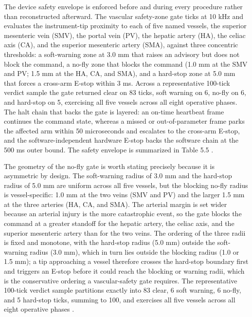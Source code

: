 The device safety envelope is enforced before and during every procedure rather
than reconstructed afterward. The vascular safety-zone gate ticks at 10 kHz and
evaluates the instrument-tip proximity to each of five named vessels, the superior
mesenteric vein (SMV), the portal vein (PV), the hepatic artery (HA), the celiac
axis (CA), and the superior mesenteric artery (SMA), against three concentric
thresholds: a soft-warning zone at 3.0 mm that raises an advisory but does not block
the command, a no-fly zone that blocks the command (1.0 mm at the SMV and PV; 1.5 mm
at the HA, CA, and SMA), and a hard-stop zone at 5.0 mm that forces a cross-arm
E-stop within 3 ms. Across a representative 100-tick verdict sample the gate
returned clear on 83 ticks, soft warning on 6, no-fly on 6, and hard-stop on 5,
exercising all five vessels across all eight operative phases. The halt chain that
backs the gate is layered: an on-time heartbeat frame continues the command state,
whereas a missed or out-of-parameter frame parks the affected arm within 50
microseconds and escalates to the cross-arm E-stop, and the software-independent
hardware E-stop backs the software chain at the 500 ms outer bound. The safety
envelope is summarized in Table 5.5 \cite{daraxwhipple,clintrustpai}.

The geometry of the no-fly gate is worth stating precisely because it is
asymmetric by design. The soft-warning radius of 3.0 mm and the hard-stop radius of
5.0 mm are uniform across all five vessels, but the blocking no-fly radius is
vessel-specific: 1.0 mm at the two veins (SMV and PV) and the larger 1.5 mm at the
three arteries (HA, CA, and SMA). The arterial margin is set wider because an
arterial injury is the more catastrophic event, so the gate blocks the command at a
greater standoff for the hepatic artery, the celiac axis, and the superior
mesenteric artery than for the two veins. The ordering of the three radii is fixed
and monotone, with the hard-stop radius (5.0 mm) outside the soft-warning radius
(3.0 mm), which in turn lies outside the blocking radius (1.0 or 1.5 mm); a tip
approaching a vessel therefore crosses the hard-stop boundary first and triggers an
E-stop before it could reach the blocking or warning radii, which is the
conservative ordering a vascular-safety gate requires. The representative 100-tick
verdict sample partitions exactly into 83 clear, 6 soft warning, 6 no-fly, and 5
hard-stop ticks, summing to 100, and exercises all five vessels across all eight
operative phases \cite{daraxwhipple,clintrustpai}.

